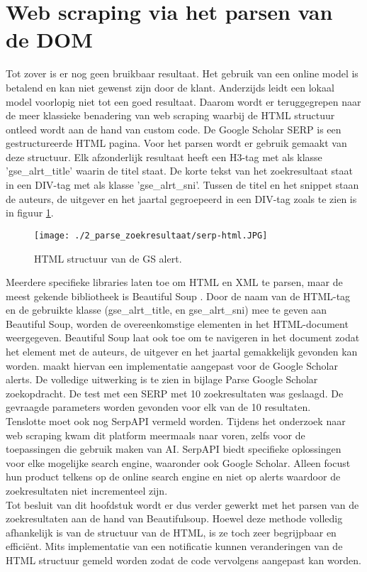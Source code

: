 \section{Web scraping via het parsen van de DOM}
Tot zover is er nog geen bruikbaar resultaat. Het gebruik van een online model is betalend en kan niet gewenst zijn door de klant. Anderzijds leidt een lokaal model voorlopig niet tot een goed resultaat. Daarom wordt er teruggegrepen naar de meer klassieke benadering van web scraping waarbij de HTML structuur ontleed wordt aan de hand van custom code.
De Google Scholar SERP is een gestructureerde HTML pagina. Voor het parsen wordt er gebruik gemaakt van deze structuur.
Elk afzonderlijk resultaat heeft een H3-tag met als klasse 'gse\_alrt\_title' waarin de titel staat. De korte tekst van het zoekresultaat staat in een DIV-tag met als klasse 'gse\_alrt\_sni'. Tussen de titel en het snippet staan de auteurs, de uitgever en het jaartal gegroepeerd in een DIV-tag zoals te zien is in figuur \ref{fig:serp-html}.
\begin{figure}
    \centering
    \texttt{[image: ./2\_parse\_zoekresultaat/serp-html.JPG]}
    \caption[HTML structuur van de GS alert.]{\label{fig:serp-html}HTML structuur van de GS alert.}
\end{figure}
\FloatBarrier
Meerdere specifieke libraries laten toe om HTML en XML te parsen, maar de meest gekende bibliotheek is Beautiful Soup \autocite{Soup2025}. Door de naam van de HTML-tag en de gebruikte klasse (gse\_alrt\_title, en gse\_alrt\_sni) mee te geven aan Beautiful Soup, worden de overeenkomstige elementen in het HTML-document weergegeven. Beautiful Soup laat ook toe om te navigeren in het document zodat het element met de auteurs, de uitgever en het jaartal gemakkelijk gevonden kan worden.
\textcite{Depaepeollama2025} maakt hiervan een implementatie aangepast voor de Google Scholar alerts. De volledige uitwerking is te zien in bijlage Parse Google Scholar zoekopdracht.
De test met een SERP met 10 zoekresultaten was geslaagd. De gevraagde parameters worden gevonden voor elk van de 10 resultaten.\\
Tenslotte moet ook nog SerpAPI \autocite{Serpapi2025} vermeld worden. Tijdens het onderzoek naar web scraping kwam dit platform meermaals naar voren, zelfs voor de toepassingen die gebruik maken van AI. SerpAPI biedt specifieke oplossingen voor elke mogelijke search engine, waaronder ook Google Scholar. Alleen focust hun product telkens op de online search engine en niet op alerts waardoor de zoekresultaten niet incrementeel zijn.\\
Tot besluit van dit hoofdstuk wordt er dus verder gewerkt met het parsen van de zoekresultaten aan de hand van Beautifulsoup. Hoewel deze methode volledig afhankelijk is van de structuur van de HTML, is ze toch zeer begrijpbaar en efficiënt. Mits implementatie van een notificatie kunnen veranderingen van de HTML structuur gemeld worden zodat de code vervolgens aangepast kan worden. 
